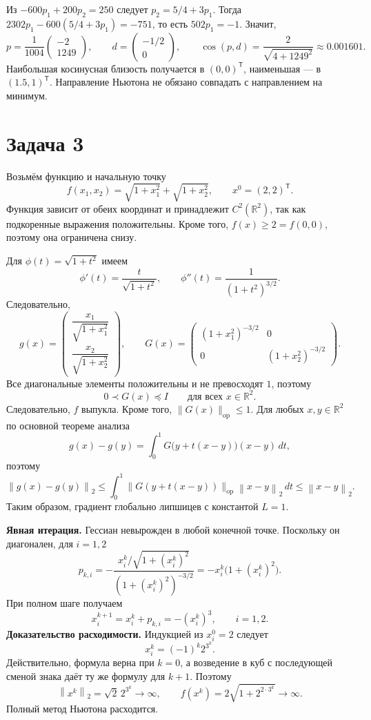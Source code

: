\documentclass[12pt,a4paper]{article}
\newcommand{\R}{\mathbb R}
\newcommand{\T}{^{\mathsf T}}
\newcommand{\norm}[1]{\left\lVert#1\right\rVert_2}
\begin{document}
Из $-600p_1+200p_2=250$ следует $p_2=5/4+3p_1$.
Тогда $2302p_1-600(5/4+3p_1)=-751$, то есть $502p_1=-1$. Значит,
\[
p=\frac1{1004}\begin{pmatrix}-2\\1249\end{pmatrix},\qquad d=\begin{pmatrix}-1/2\\0\end{pmatrix},\qquad
\cos(p,d)=\frac2{\sqrt{4+1249^2}}\approx0.001601.
\]
Наибольшая косинусная близость получается в $(0,0)\T$, наименьшая --- в $(1.5,1)\T$. Направление Ньютона не обязано совпадать с направлением на минимум.

\section*{Задача 3}
Возьмём функцию и начальную точку
\[
f(x_1,x_2)=\sqrt{1+x_1^2}+\sqrt{1+x_2^2},\qquad x^0=(2,2)\T.
\]
Функция зависит от обеих координат и принадлежит $C^2(\R^2)$, так как подкоренные выражения положительны. Кроме того, $f(x)\ge2=f(0,0)$, поэтому она ограничена снизу.

Для $\phi(t)=\sqrt{1+t^2}$ имеем
\[
\phi'(t)=\frac{t}{\sqrt{1+t^2}},\qquad
\phi''(t)=\frac1{(1+t^2)^{3/2}}.
\]
Следовательно,
\[
g(x)=\begin{pmatrix}\dfrac{x_1}{\sqrt{1+x_1^2}}\\[5pt]\dfrac{x_2}{\sqrt{1+x_2^2}}\end{pmatrix},\qquad
G(x)=\begin{pmatrix}(1+x_1^2)^{-3/2}&0\\0&(1+x_2^2)^{-3/2}\end{pmatrix}.
\]
Все диагональные элементы положительны и не превосходят $1$, поэтому
\[
0\prec G(x)\preceq I\qquad\text{для всех }x\in\R^2.
\]
Следовательно, $f$ выпукла.
Кроме того, $\|G(x)\|_{\mathrm{op}}\le1$. Для любых $x,y\in\R^2$ по основной теореме анализа
\[
g(x)-g(y)=\int_0^1G\bigl(y+t(x-y)\bigr)(x-y)\,dt,
\]
поэтому
\[
\norm{g(x)-g(y)}\le\int_0^1\|G(y+t(x-y))\|_{\mathrm{op}}\norm{x-y}\,dt
\le\norm{x-y}.
\]
Таким образом, градиент глобально липшицев с константой $L=1$.

\textbf{Явная итерация.} Гессиан невырожден в любой конечной точке. Поскольку он диагонален, для $i=1,2$
\[
p_{k,i}=-\frac{x_i^k/\sqrt{1+(x_i^k)^2}}{(1+(x_i^k)^2)^{-3/2}}
=-x_i^k\bigl(1+(x_i^k)^2\bigr).
\]
При полном шаге получаем
\[
x_i^{k+1}=x_i^k+p_{k,i}=-(x_i^k)^3,\qquad i=1,2.
\]
\textbf{Доказательство расходимости.} Индукцией из $x_i^0=2$ следует
\[
x_i^k=(-1)^k2^{3^k}.
\]
Действительно, формула верна при $k=0$, а возведение в куб с последующей сменой знака даёт ту же формулу для $k+1$. Поэтому
\[
\norm{x^k}=\sqrt2\,2^{3^k}\longrightarrow\infty,\qquad
f(x^k)=2\sqrt{1+2^{2\cdot3^k}}\longrightarrow\infty.
\]
Полный метод Ньютона расходится.
\end{document}
